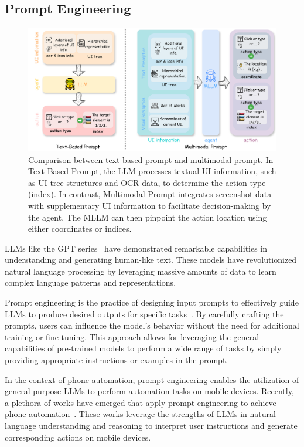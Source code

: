 \subsection{Prompt Engineering}
\label{subsec:prompt_engineering}

\begin{figure}[ht]
    \centering
    \includegraphics[width=0.95\linewidth]{figures/pe_llm_vs_mllm.drawio.png}
    \caption{Comparison between text-based prompt and multimodal prompt. In Text-Based Prompt, the LLM processes textual UI information, such as UI tree structures and OCR data, to determine the action type (index). In contrast, Multimodal Prompt integrates screenshot data with supplementary UI information to facilitate decision-making by the agent. The MLLM can then pinpoint the action location using either coordinates or indices.}
    \label{fig:pe_llm_vs_mllm}
\end{figure}


LLMs like the GPT series~\cite{radford2018gpt1,radford2019gpt2,brown2020gpt3} have demonstrated remarkable capabilities in understanding and generating human-like text. These models have revolutionized natural language processing by leveraging massive amounts of data to learn complex language patterns and representations.

Prompt engineering is the practice of designing input prompts to effectively guide LLMs to produce desired outputs for specific tasks~\cite{wei2022chain, yao2024tree, chen2022program}. By carefully crafting the prompts, users can influence the model's behavior without the need for additional training or fine-tuning. This approach allows for leveraging the general capabilities of pre-trained models to perform a wide range of tasks by simply providing appropriate instructions or examples in the prompt.

In the context of phone automation, prompt engineering enables the utilization of general-purpose LLMs to perform automation tasks on mobile devices. Recently, a plethora of works have emerged that apply prompt engineering to achieve phone automation~\cite{wen2023droidbot,yan2023gpt,zhang2023appagent,wang2024mobileagentv1,wang2024mobileagentv2,zhang2024mobileexperts,lu2024omniparser,song2023navigating,taeb2024axnav,yang2024security,liu2024vision, huang2024promptrpa}. These works leverage the strengths of LLMs in natural language understanding and reasoning to interpret user instructions and generate corresponding actions on mobile devices.

